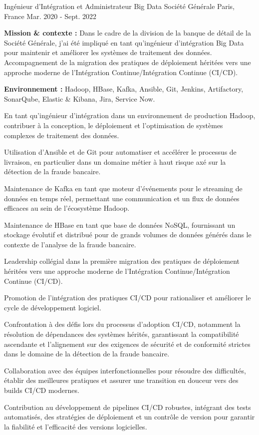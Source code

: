 \begin{cventries}
\cventry
{Ingénieur d'Intégration et Administrateur Big Data} %
{Société Générale} %
{Paris, France} %
{Mar. 2020 - Sept. 2022} %
{
  \begin{cvitems} %
    \item {\textbf{Mission \& contexte :} Dans le cadre de la division de la banque de détail de la Société Générale, j'ai été impliqué en tant qu'ingénieur d'intégration Big Data pour maintenir et améliorer les systèmes de traitement des données. Accompagnement de la migration des pratiques de déploiement héritées vers une approche moderne de l'Intégration Continue/Intégration Continue (CI/CD).}
    \item {\textbf{Environnement :} Hadoop, HBase, Kafka, Ansible, Git, Jenkins, Artifactory, SonarQube, Elastic \& Kibana, Jira, Service Now.}
    \item {En tant qu'ingénieur d'intégration dans un environnement de production Hadoop, contribuer à la conception, le déploiement et l'optimisation de systèmes complexes de traitement des données.}
    \item {Utilisation d'Ansible et de Git pour automatiser et accélérer le processus de livraison, en particulier dans un domaine métier à haut risque axé sur la détection de la fraude bancaire.}
    \item {Maintenance de Kafka en tant que moteur d'événements pour le streaming de données en temps réel, permettant une communication et un flux de données efficaces au sein de l'écosystème Hadoop.}
    \item {Maintenance de HBase en tant que base de données NoSQL, fournissant un stockage évolutif et distribué pour de grands volumes de données générés dans le contexte de l'analyse de la fraude bancaire.}
    \item {Leadership collégial dans la première migration des pratiques de déploiement héritées vers une approche moderne de l'Intégration Continue/Intégration Continue (CI/CD).}
    \item {Promotion de l'intégration des pratiques CI/CD pour rationaliser et améliorer le cycle de développement logiciel.}
    \item {Confrontation à des défis lors du processus d'adoption CI/CD, notamment la résolution de dépendances des systèmes hérités, garantissant la compatibilité ascendante et l'alignement sur des exigences de sécurité et de conformité strictes dans le domaine de la détection de la fraude bancaire.}
    \item {Collaboration avec des équipes interfonctionnelles pour résoudre des difficultés, établir des meilleures pratiques et assurer une transition en douceur vers des builds CI/CD modernes.}
    \item {Contribution au développement de pipelines CI/CD robustes, intégrant des tests automatisés, des stratégies de déploiement et un contrôle de version pour garantir la fiabilité et l'efficacité des versions logicielles.}
  \end{cvitems}  
}



\end{cventries}

